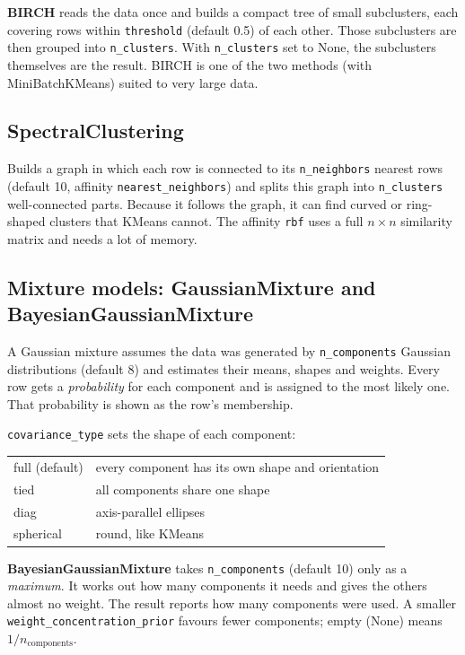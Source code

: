 \documentclass[11pt,a4paper]{article}
\newcommand{\param}[1]{\texttt{#1}}         %
\begin{document}
\textbf{BIRCH} reads the data once and builds a compact tree of small subclusters, each covering rows within
\param{threshold} (default 0.5) of each other. Those subclusters are then grouped into \param{n\_clusters}. With
\param{n\_clusters} set to None, the subclusters themselves are the result. BIRCH is one of the two methods (with
MiniBatchKMeans) suited to very large data.

\subsection{SpectralClustering}

Builds a graph in which each row is connected to its \param{n\_neighbors} nearest rows (default 10, affinity
\texttt{nearest\_neighbors}) and splits this graph into \param{n\_clusters} well-connected parts. Because it follows
the graph, it can find curved or ring-shaped clusters that KMeans cannot. The affinity \texttt{rbf} uses a full
$n\times n$ similarity matrix and needs a lot of memory.

\subsection{Mixture models: GaussianMixture and BayesianGaussianMixture}

A Gaussian mixture assumes the data was generated by \param{n\_components} Gaussian distributions (default 8) and
estimates their means, shapes and weights. Every row gets a \emph{probability} for each component and is assigned
to the most likely one. That probability is shown as the row's membership.

\param{covariance\_type} sets the shape of each component:

\begin{center}
\begin{tabular}{ll}
\toprule
full (default) & every component has its own shape and orientation\\
tied & all components share one shape\\
diag & axis-parallel ellipses\\
spherical & round, like KMeans\\
\bottomrule
\end{tabular}
\end{center}

\textbf{BayesianGaussianMixture} takes \param{n\_components} (default 10) only as a \emph{maximum}. It works out how
many components it needs and gives the others almost no weight. The result reports how many components were used.
A smaller \param{weight\_concentration\_prior} favours fewer components; empty (None) means $1/n_\text{components}$.
\end{document}
